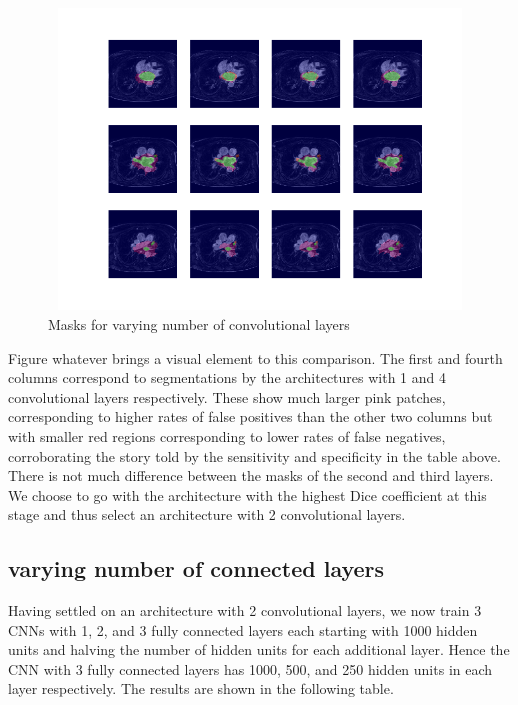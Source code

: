 \begin{figure}
\centering
\includegraphics[trim=2.5cm 1.5cm 2cm 1.5cm, clip=true, height=80mm, width=150mm]{Chapter3/mask_results_varying_number_of_convolutional_layers.png}
\caption{Masks for varying number of convolutional layers}
\end{figure}

\noindent Figure whatever brings a visual element to this comparison. The first and fourth columns correspond to segmentations by the architectures with 1 and 4 convolutional layers respectively. These show much larger pink patches, corresponding to higher rates of false positives than the other two columns but with smaller red regions corresponding to lower rates of false negatives, corroborating the story told by the sensitivity and specificity in the table above. There is not much difference between the masks of the second and third layers.\\

\noindent We choose to go with the architecture with the highest Dice coefficient at this stage and thus select an architecture with 2 convolutional layers. 

\subsection{varying number of connected layers}

\noindent Having settled on an architecture with 2 convolutional layers, we now train 3 CNNs with 1, 2, and 3 fully connected layers each starting with 1000 hidden units and halving the number of hidden units for each additional layer. Hence the CNN with 3 fully connected layers has 1000, 500, and 250 hidden units in each layer respectively. The results are shown in the following table.\\

